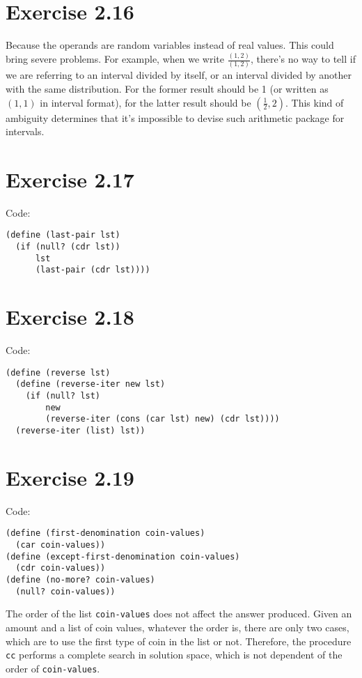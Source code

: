 \documentclass[../main.tex]{subfiles}
\begin{document}
\section{Exercise 2.16}

Because the operands are random variables instead of real values. This
 could bring severe problems. For example, when we write $\frac{(1, 2)}{(1, 2)}$,
 there's no way to tell if we are referring to an interval divided by itself,
 or an interval divided by another with the same distribution. For the former
 result should be 1 (or written as $(1, 1)$ in interval format), for the latter
 result should be $(\frac{1}{2}, 2)$. This kind of ambiguity determines that
 it's impossible to devise such arithmetic package for intervals.

\section{Exercise 2.17}

Code:

\begin{lstlisting}
(define (last-pair lst)
  (if (null? (cdr lst))
      lst
      (last-pair (cdr lst))))
\end{lstlisting}

\section{Exercise 2.18}

Code:

\begin{lstlisting}
(define (reverse lst)
  (define (reverse-iter new lst)
    (if (null? lst)
        new
        (reverse-iter (cons (car lst) new) (cdr lst))))
  (reverse-iter (list) lst))
\end{lstlisting}

\section{Exercise 2.19}

Code:

\begin{lstlisting}
(define (first-denomination coin-values)
  (car coin-values))
(define (except-first-denomination coin-values)
  (cdr coin-values))
(define (no-more? coin-values)
  (null? coin-values))
\end{lstlisting}

The order of the list \lstinline{coin-values} does not
 affect the answer produced. Given an amount and a
 list of coin values, whatever the order is, there are
 only two cases, which are to use the first type of coin
 in the list or not. Therefore, the procedure \lstinline{cc}
 performs a complete search in solution space, which
 is not dependent of the order of \lstinline{coin-values}.
\end{document}

